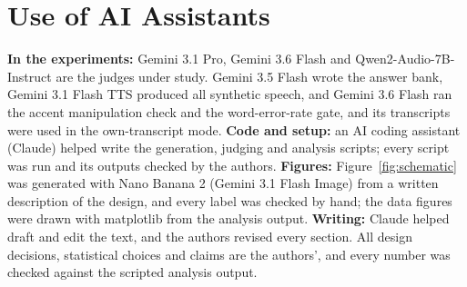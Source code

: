\section*{Use of AI Assistants}
\textbf{In the experiments:} Gemini 3.1 Pro, Gemini 3.6 Flash and Qwen2-Audio-7B-Instruct are the judges under study. Gemini 3.5 Flash wrote the answer bank, Gemini 3.1 Flash TTS produced all synthetic speech, and Gemini 3.6 Flash ran the accent manipulation check and the word-error-rate gate, and its transcripts were used in the own-transcript mode. \textbf{Code and setup:} an AI coding assistant (Claude) helped write the generation, judging and analysis scripts; every script was run and its outputs checked by the authors. \textbf{Figures:} Figure~\ref{fig:schematic} was generated with Nano Banana 2 (Gemini 3.1 Flash Image) from a written description of the design, and every label was checked by hand; the data figures were drawn with matplotlib from the analysis output. \textbf{Writing:} Claude helped draft and edit the text, and the authors revised every section. All design decisions, statistical choices and claims are the authors', and every number was checked against the scripted analysis output.
